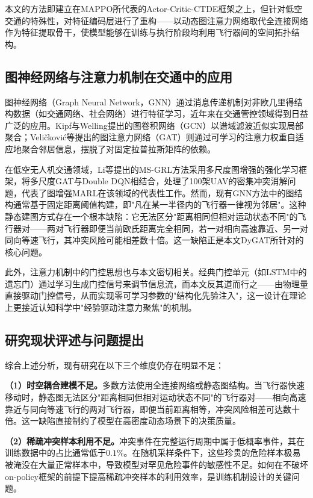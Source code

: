\documentclass[12pt,a4paper,UTF8]{ctexbook}
\begin{document}
本文的方法即建立在MAPPO所代表的Actor-Critic-CTDE框架之上，但针对低空交通的特殊性，对特征编码层进行了重构——以动态图注意力网络取代全连接网络作为特征提取骨干，使模型能够在训练与执行阶段均利用飞行器间的空间拓扑结构。

\subsection{图神经网络与注意力机制在交通中的应用}

图神经网络（Graph Neural Network，GNN）通过消息传递机制对非欧几里得结构数据（如交通网络、社会网络）进行特征学习，近年来在交通管控领域得到日益广泛的应用。Kipf与Welling\cite{ref32}提出的图卷积网络（GCN）以谱域滤波近似实现局部聚合；Veličković等\cite{ref31}提出的图注意力网络（GAT）则通过可学习的注意力权重自适应地聚合邻居信息，摆脱了对固定拉普拉斯矩阵的依赖。

在低空无人机交通领域，Li等\cite{ref10}提出的MS-GRL方法采用多尺度图增强的强化学习框架，将多尺度GAT与Double DQN相结合，处理了100架UAV的密集冲突消解问题，代表了图增强MARL在该领域的代表性工作。然而，现有GNN方法中的图结构通常基于固定距离阈值构建，即"凡在某一半径内的飞行器一律视为邻居"。这种静态建图方式存在一个根本缺陷：它无法区分"距离相同但相对运动状态不同"的飞行器对——两对飞行器即便当前欧氏距离完全相同，若一对相向高速靠近、另一对同向等速飞行，其冲突风险可能相差数十倍。这一缺陷正是本文DyGAT所针对的核心问题。

此外，注意力机制中的门控思想也与本文密切相关。经典门控单元（如LSTM中的遗忘门\cite{ref37}）通过学习生成门控信号来调节信息流，而本文反其道而行之——由物理量直接驱动门控信号，从而实现零可学习参数的"结构化先验注入"，这一设计在理论上更接近认知科学中"经验驱动注意力聚焦"的机制。

\subsection{研究现状评述与问题提出}

综合上述分析，现有研究在以下三个维度仍存在明显不足：

\textbf{（1）时空耦合建模不足。}多数方法使用全连接网络或静态图结构\cite{ref8,ref10,ref11}。当飞行器快速移动时，静态图无法区分"距离相同但相对运动状态不同"的飞行器对——相向高速靠近与同向等速飞行的两对飞行器，即便当前距离相等，冲突风险相差可达数十倍。这一缺陷直接制约了模型在高密度动态场景下的决策质量。

\textbf{（2）稀疏冲突样本利用不足。}冲突事件在完整运行周期中属于低概率事件，其在训练数据中的占比通常低于$0.1\%$\cite{ref12,ref13}。在随机采样条件下，这些珍贵的危险样本极易被淹没在大量正常样本中，导致模型对罕见危险事件的敏感性不足。如何在不破坏on-policy框架的前提下提高稀疏冲突样本的利用效率，是训练机制设计的关键问题。
\end{document}
